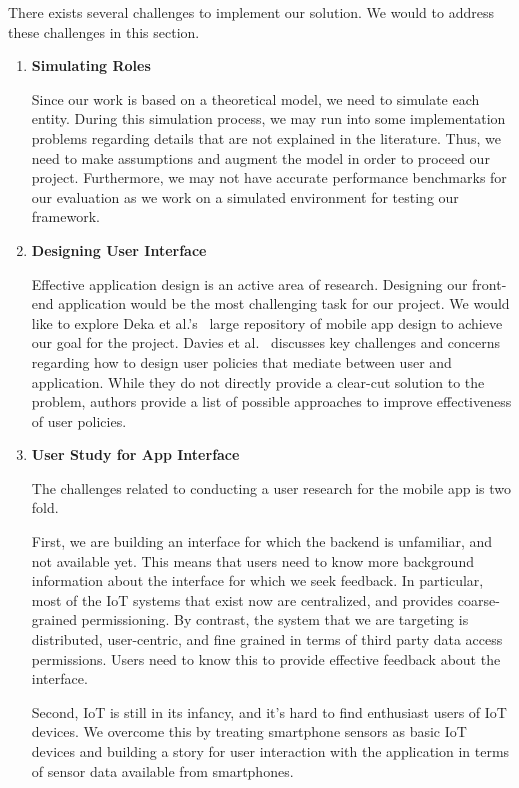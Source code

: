 There exists several challenges to implement our solution. We would to address these challenges in this section. 

\begin{enumerate}
\item \textbf{Simulating Roles}

Since our work is based on a theoretical model, we need to simulate each entity. During this simulation process, we may run into some implementation problems regarding details that are not explained in the literature. Thus, we need to make assumptions and augment the model in order to proceed our project. Furthermore, we may not have accurate performance benchmarks for our evaluation as we work on a simulated environment for testing our framework. 

\item \textbf{Designing User Interface}

Effective application design is an active area of research. Designing our front-end application would be the most challenging task for our project. We would like to explore Deka et al.'s~\cite{rico} large repository of mobile app design to achieve our goal for the project. Davies et al.~\cite{davies} discusses key challenges and concerns regarding how to design user policies that mediate between user and application. While they do not directly provide a clear-cut solution to the problem, authors provide a list of possible approaches to improve effectiveness of user policies.  

\item \textbf{User Study for App Interface}

The challenges related to conducting a user research for the mobile app is two fold.

First, we are building an interface for which the backend is unfamiliar, and not available yet. This means that users need to know more background information about the interface for which we seek feedback. In particular, most of the IoT systems that exist now are centralized, and provides coarse-grained permissioning. By contrast, the system that we are targeting is distributed, user-centric, and fine grained in terms of third party data access permissions. Users need to know this to provide effective feedback about the interface.

Second, IoT is still in its infancy, and it's hard to find enthusiast users of IoT devices. We overcome this by treating smartphone sensors as basic IoT devices and building a story for user interaction with the application in terms of sensor data available from smartphones.
\end{enumerate}